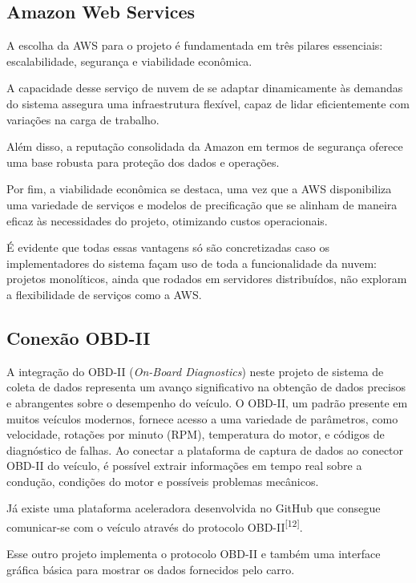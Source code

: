     \subsection{Amazon Web Services}

    A escolha da AWS para o projeto é fundamentada em três pilares essenciais: escalabilidade, segurança e viabilidade econômica. 
    
    A capacidade desse serviço de nuvem de se adaptar dinamicamente às demandas do sistema assegura uma infraestrutura flexível, capaz de lidar eficientemente com variações na carga de trabalho. 
    
    Além disso, a reputação consolidada da Amazon em termos de segurança oferece uma base robusta para proteção dos dados e operações. 
    
    Por fim, a viabilidade econômica se destaca, uma vez que a AWS disponibiliza uma variedade de serviços e modelos de precificação que se alinham de maneira eficaz às necessidades do projeto, otimizando custos operacionais.

    É evidente que todas essas vantagens só são concretizadas caso os implementadores do sistema façam uso de toda a funcionalidade da nuvem: projetos monolíticos, ainda que rodados em servidores distribuídos, não exploram a flexibilidade de serviços como a AWS. 

    \subsection{Conexão OBD-II}

    A integração do OBD-II (\textit{On-Board Diagnostics}) neste projeto de sistema de coleta de dados representa um avanço significativo na obtenção de dados precisos e abrangentes sobre o desempenho do veículo. O OBD-II, um padrão presente em muitos veículos modernos, fornece acesso a uma variedade de parâmetros, como velocidade, rotações por minuto (RPM), temperatura do motor, e códigos de diagnóstico de falhas. Ao conectar a plataforma de captura de dados ao conector OBD-II do veículo, é possível extrair informações em tempo real sobre a condução, condições do motor e possíveis problemas mecânicos.

    Já existe uma plataforma aceleradora desenvolvida no GitHub que consegue comunicar-se com o veículo através do protocolo OBD-II\textsuperscript{[12]}. 
    
    Esse outro projeto implementa o protocolo OBD-II e também uma interface gráfica básica para mostrar os dados fornecidos pelo carro.

